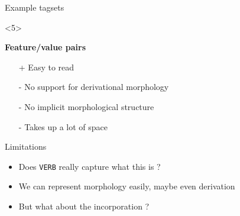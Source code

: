 \documentclass{beamer}
\begin{document}
\begin{frame}{Example tagsets}
\begin{onlyenv}
\end{onlyenv}

\begin{onlyenv}<5>
\begin{center}
\textbf{Feature/value pairs} 
\end{center}
\begin{center}
\end{center}

\begin{itemize}
 \item[+] Easy to read
 \item[-] No support for derivational morphology
 \item[-] No implicit morphological structure
 \item[-] Takes up a lot of space 
\end{itemize}

\end{onlyenv}

\end{frame}


\begin{frame}{Limitations}

\begin{center}
\end{center}

\begin{itemize}
  \item Does \texttt{VERB} really capture what this is ?
  \item We can represent morphology easily, maybe even derivation
  \item But what about the incorporation ?
\end{itemize}



\end{frame}
\end{document}
